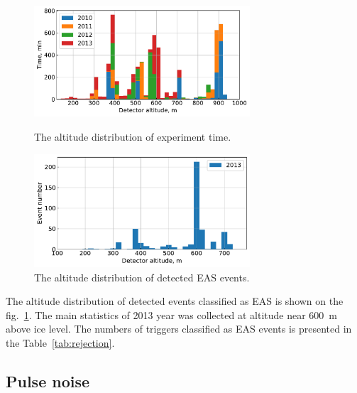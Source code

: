 \documentclass[final,5p,times,twocolumn]{elsarticle}
\begin{document}
\begin{figure}[t]
    \includegraphics[width=19pc]{figs/time_on_altitude.pdf}%
    \caption{The altitude distribution of experiment time.}
    \label{fig:time_on_altitude}
\vspace{2pc}
    \includegraphics[width=19pc]{figs/height_eas.pdf}
    \caption{The altitude distribution of detected EAS events.}
    \label{fig:height_eas}
\end{figure}


The altitude distribution of detected events classified as EAS is shown on the fig.~\ref{fig:height_eas}. The main statistics of 2013 year was collected at altitude near 600~m above ice level. The numbers of triggers classified as EAS events is presented in the Table~\ref{tab:rejection}.




\subsection{Pulse noise}
\label{sect:noiseremoval}
\end{document}
